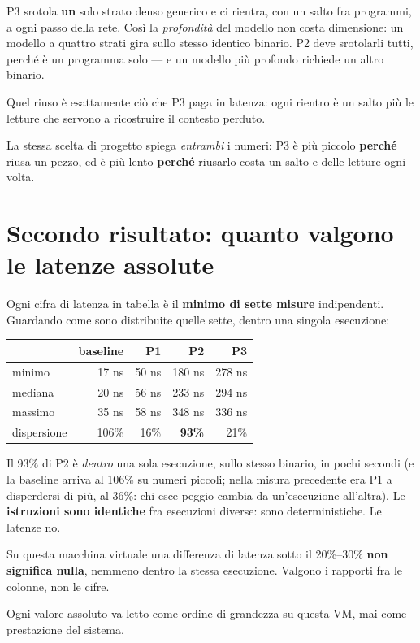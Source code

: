 \documentclass[11pt,a4paper,oneside]{report}
\begin{document}
P3 srotola \textbf{un} solo strato denso generico e ci rientra, con un salto fra
programmi, a ogni passo della rete. Così la \emph{profondità} del modello non
costa dimensione: un modello a quattro strati gira sullo stesso identico binario.
P2 deve srotolarli tutti, perché è un programma solo --- e un modello più
profondo richiede un altro binario.

Quel riuso è esattamente ciò che P3 paga in latenza: ogni rientro è un salto più
le letture che servono a ricostruire il contesto perduto.

\begin{lezione}
La stessa scelta di progetto spiega \emph{entrambi} i numeri: P3 è più piccolo
\textbf{perché} riusa un pezzo, ed è più lento \textbf{perché} riusarlo costa un
salto e delle letture ogni volta.
\end{lezione}

\section{Secondo risultato: quanto valgono le latenze assolute}

Ogni cifra di latenza in tabella è il \textbf{minimo di sette misure}
indipendenti. Guardando come sono distribuite quelle sette, dentro una singola
esecuzione:

\begin{center}
\small
\begin{tabular}{@{}lrrrr@{}}
\toprule
& baseline & P1 & P2 & P3 \\
\midrule
minimo   & 17 ns & 50 ns & 180 ns & 278 ns \\
mediana  & 20 ns & 56 ns & 233 ns & 294 ns \\
massimo  & 35 ns & 58 ns & 348 ns & 336 ns \\
\midrule
dispersione & 106\% & 16\% & \textbf{93\%} & 21\% \\
\bottomrule
\end{tabular}
\end{center}

Il 93\% di P2 è \emph{dentro} una sola esecuzione, sullo stesso binario, in
pochi secondi (e la baseline arriva al 106\% su numeri piccoli; nella misura
precedente era P1 a disperdersi di più, al 36\%: chi esce peggio cambia da
un'esecuzione all'altra). Le \textbf{istruzioni sono identiche} fra esecuzioni diverse: sono
deterministiche. Le latenze no.

\begin{lezione}
Su questa macchina virtuale una differenza di latenza sotto il 20\%--30\%
\textbf{non significa nulla}, nemmeno dentro la stessa esecuzione. Valgono i
rapporti fra le colonne, non le cifre.

Ogni valore assoluto va letto come ordine di grandezza su questa VM, mai come
prestazione del sistema.
\end{lezione}
\end{document}
